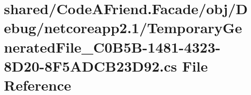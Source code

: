 \hypertarget{shared_2_code_a_friend_8_facade_2obj_2_debug_2netcoreapp2_81_2_temporary_generated_file__036_c0_89403907dd5f895f555ce51c97b6a314}{}\section{shared/\+Code\+A\+Friend.Facade/obj/\+Debug/netcoreapp2.1/\+Temporary\+Generated\+File\+\_\+C0\+B5\+B-\/1481-\/4323-\/8\+D20-\/8\+F5\+A\+D\+C\+B23\+D92.cs File Reference}
\label{shared_2_code_a_friend_8_facade_2obj_2_debug_2netcoreapp2_81_2_temporary_generated_file__036_c0_89403907dd5f895f555ce51c97b6a314}
